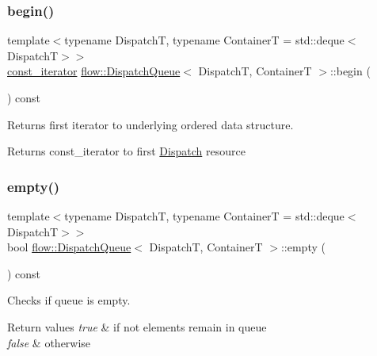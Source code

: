 \subsubsection{\texorpdfstring{begin()}{begin()}}
{\footnotesize\ttfamily template$<$typename DispatchT, typename ContainerT = std\+::deque$<$\+Dispatch\+T$>$$>$ \\
\hyperlink{classflow_1_1_dispatch_queue_a307496fdc34a2d59e11114dabf85dc8a}{const\+\_\+iterator} \hyperlink{classflow_1_1_dispatch_queue}{flow\+::\+Dispatch\+Queue}$<$ DispatchT, ContainerT $>$\+::begin (\begin{DoxyParamCaption}{ }\end{DoxyParamCaption}) const\hspace{0.3cm}{\ttfamily [inline]}}



Returns first iterator to underlying ordered data structure. 

\begin{DoxyReturn}{Returns}
{\ttfamily const\+\_\+iterator} to first \hyperlink{classflow_1_1_dispatch}{Dispatch} resource 
\end{DoxyReturn}
\mbox{\label{classflow_1_1_dispatch_queue_a447412abd83540a6c595dd7a17116c6c}} 
\subsubsection{\texorpdfstring{empty()}{empty()}}
{\footnotesize\ttfamily template$<$typename DispatchT, typename ContainerT = std\+::deque$<$\+Dispatch\+T$>$$>$ \\
bool \hyperlink{classflow_1_1_dispatch_queue}{flow\+::\+Dispatch\+Queue}$<$ DispatchT, ContainerT $>$\+::empty (\begin{DoxyParamCaption}{ }\end{DoxyParamCaption}) const\hspace{0.3cm}{\ttfamily [inline]}}



Checks if queue is empty. 


\begin{DoxyRetVals}{Return values}
{\em true} & if not elements remain in queue \\
\hline
{\em false} & otherwise \\
\hline
\end{DoxyRetVals}
\mbox{\label{classflow_1_1_dispatch_queue_a359b294ce203e10ee9fafc147f6638ff}} 
